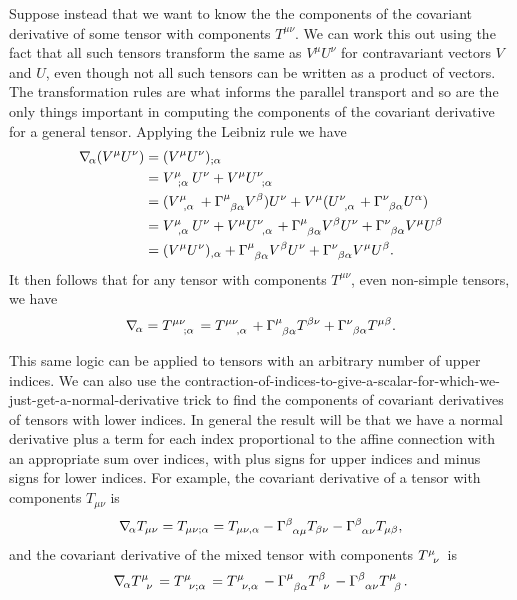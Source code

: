 \documentclass[fleqn]{NotesClass}
\newcommand*{\christoffel}[3]{\tensor{\Gamma}{^{#1}_{{#2}{#3}}}}
\newcommand*{\covariantDerivative}[1]{\nabla_{\!#1}}
\begin{document}
    Suppose instead that we want to know the the components of the covariant derivative of some tensor with components \(T^{\mu\nu}\).
    We can work this out using the fact that all such tensors transform the same as \(V^\mu U^\nu\) for contravariant vectors \(V\) and \(U\), even though not all such tensors can be written as a product of vectors.
    The transformation rules are what informs the parallel transport and so are the only things important in computing the components of the covariant derivative for a general tensor.
    Applying the Leibniz rule we have
    \begin{align}
        \covariantDerivative{\alpha} (V^\mu U^\nu) &= (V^\mu U^\nu)_{;\alpha}\\
        &= \tensor{V}{^\mu_{;\alpha}} U^\nu + V^\mu \tensor{U}{^\nu_{;\alpha}}\\
        &= (\tensor{V}{^\mu_{,\alpha}} + \christoffel{\mu}{\beta}{\alpha} V^\beta) U^\nu + V^\mu (\tensor{U}{^\nu_{,\alpha}} + \christoffel{\nu}{\beta}{\alpha}U^\alpha)\\
        &= \tensor{V}{^\mu_{,\alpha}}U^\nu + V^\mu\tensor{U}{^\nu_{,\alpha}} + \christoffel{\mu}{\beta}{\alpha} V^\beta U^\nu + \christoffel{\nu}{\beta}{\alpha} V^\mu U^\beta\\
        &= (V^\mu U^\nu)_{,\alpha} + \christoffel{\mu}{\beta}{\alpha} V^\beta U^\nu + \christoffel{\nu}{\beta}{\alpha} V^\mu U^\beta.
    \end{align}
    It then follows that for any tensor with components \(T^{\mu\nu}\), even non-simple tensors, we have
    \begin{equation}
        \covariantDerivative{\alpha} = \tensor{T}{^{\mu\nu}_{;\alpha}} = \tensor{T}{^{\mu\nu}_{,\alpha}} + \christoffel{\mu}{\beta}{\alpha} T^{\beta\nu} + \christoffel{\nu}{\beta}{\alpha} T^{\mu\beta}.
    \end{equation}
    
    This same logic can be applied to tensors with an arbitrary number of upper indices.
    We can also use the contraction-of-indices-to-give-a-scalar-for-which-we-just-get-a-normal-derivative trick to find the components of covariant derivatives of tensors with lower indices.
    In general the result will be that we have a normal derivative plus a term for each index proportional to the affine connection with an appropriate sum over indices, with plus signs for upper indices and minus signs for lower indices.
    For example, the covariant derivative of a tensor with components \(T_{\mu\nu}\) is
    \begin{equation}
        \covariantDerivative{\alpha} T_{\mu\nu} = T_{\mu\nu;\alpha} = T_{\mu\nu,\alpha} - \christoffel{\beta}{\alpha}{\mu} T_{\beta\nu} - \christoffel{\beta}{\alpha}{\nu} T_{\mu\beta},
    \end{equation}
    and the covariant derivative of the mixed tensor with components \(\tensor{T}{^\mu_\nu}\) is
    \begin{equation}
        \covariantDerivative{\alpha} \tensor{T}{^\mu_\nu} = \tensor{T}{^\mu_{\nu;\alpha}} = \tensor{T}{^\mu_{\nu,\alpha}} - \christoffel{\mu}{\beta}{\alpha}\tensor{T}{^\beta_\nu} - \christoffel{\beta}{\alpha}{\nu} \tensor{T}{^\mu_\beta}.
    \end{equation}
    
\end{document}
